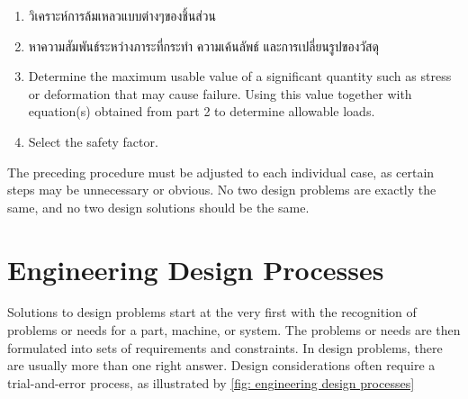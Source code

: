 \documentclass[a4paper,openany,12pt]{book}
\begin{document}
\begin{enumerate}
\item วิเคราะห์การล้มเหลวแบบต่างๆของชิ้นส่วน

\item หาความสัมพันธ์ระหว่างภาระที่กระทำ ความเค้นลัพธ์ และการเปลี่ยนรูปของวัสดุ

\item Determine the maximum usable value of a significant quantity such as
stress or deformation that may cause failure. Using this value
together with equation(s) obtained from part 2 to determine allowable
loads.

\item Select the safety factor.
\end{enumerate}

The preceding procedure must be adjusted to each individual case, as
certain steps may be unnecessary or obvious. No two design problems are
exactly the same, and no two design solutions should be the same.

\section{Engineering Design Processes}
\label{engineering-design-processes}
Solutions to design problems start at the very first with the
recognition of problems or needs for a part, machine, or system. The
problems or needs are then formulated into sets of requirements and
constraints. In design problems, there are usually more than one right
answer. Design considerations often require a trial-and-error process,
as illustrated by \ref{fig: engineering design processes}
\end{document}
